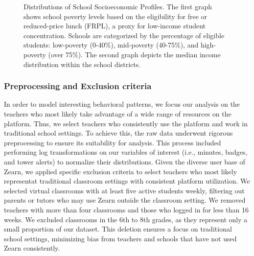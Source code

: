 \documentclass[
  number,
  preprint,
  3p,
  onecolumn]{elsarticle}
\begin{document}
\begin{figure}

\begin{minipage}{0.50\linewidth}



\end{minipage}%
%
\begin{minipage}{0.50\linewidth}



\end{minipage}%

\caption{\label{fig-income-dist}Distributions of School Socioeconomic
Profiles. The first graph shows school poverty levels based on the
eligibility for free or reduced-price lunch (FRPL), a proxy for
low-income student concentration. Schools are categorized by the
percentage of eligible students: low-poverty (0-40\%), mid-poverty
(40-75\%), and high-poverty (over 75\%). The second graph depicts the
median income distribution within the school districts.}

\end{figure}%

\subsubsection{Preprocessing and Exclusion
criteria}\label{preprocessing-and-exclusion-criteria}

In order to model interesting behavioral patterns, we focus our analysis
on the teachers who most likely take advantage of a wide range of
resources on the platform. Thus, we select teachers who consistently use
the platform and work in traditional school settings. To achieve this,
the raw data underwent rigorous preprocessing to ensure its suitability
for analysis. This process included performing log transformations on
our variables of interest (i.e., minutes, badges, and tower alerts) to
normalize their distributions. Given the diverse user base of Zearn, we
applied specific exclusion criteria to select teachers who most likely
representat traditional classroom settings with consistent platform
utilization. We selected virtual classrooms with at least five active
students weekly, filtering out parents or tutors who may use Zearn
outside the classroom setting. We removed teachers with more than four
classrooms and those who logged in for less than 16 weeks. We excluded
classrooms in the 6th to 8th grades, as they represent only a small
proportion of our dataset. This deletion ensures a focus on traditional
school settings, minimizing bias from teachers and schools that have not
used Zearn consistently.
\end{document}
